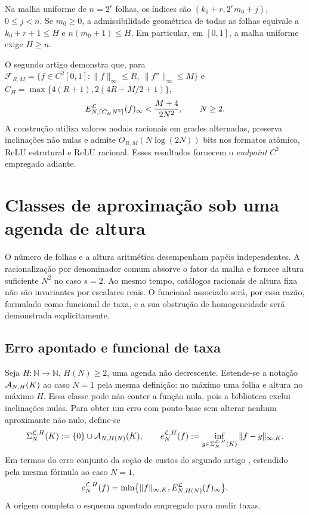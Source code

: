 Na malha uniforme de $n=2^r$ folhas, os índices são $(k_0+r,2^rm_0+j)$, $0\le j<n$. Se $m_0\ge0$, a admissibilidade geométrica de todas as folhas equivale a $k_0+r+1\le H$ e $n(m_0+1)\le H$. Em particular, em $[0,1]$, a malha uniforme exige $H\ge n$.

O segundo artigo demonstra que, para $\mathcal F_{R,M}=\{f\in C^2[0,1]:\|f\|_\infty\le R,\ \|f''\|_\infty\le M\}$ e $C_H=\max\{4(R+1),2(4R+M/2+1)\}$,
\[
 E_{N,\lceil C_HN^2\rceil}^{\mathcal{L}}(f)_\infty<\frac{M+4}{2N^2},\qquad N\ge2.
\]
A construção utiliza valores nodais racionais em grades alternadas, preserva inclinações não nulas e admite $O_{R,M}(N\log(2N))$ bits nos formatos atômico, ReLU estrutural e ReLU racional. Esses resultados fornecem o \emph{endpoint} $C^2$ empregado adiante.

\section{Classes de aproximação sob uma agenda de altura}
\label{artigo_3:sec:approximation-classes}

O número de folhas e a altura aritmética desempenham papéis independentes. A
racionalização por denominador comum absorve o fator da malha e fornece
altura suficiente $N^2$ no caso $s=2$. Ao mesmo tempo, catálogos racionais de
altura fixa não são invariantes por escalares reais. O funcional
associado será, por essa razão, formulado como funcional de taxa, e a sua obstrução de
homogeneidade será demonstrada explicitamente.

\subsection{Erro apontado e funcional de taxa}

Seja $H:\mathbb N\to\mathbb N$, $H(N)\ge2$, uma agenda não decrescente.
Estende-se a notação $\mathcal{A}_{N,H}(K)$ ao caso $N=1$ pela mesma
definição: no máximo uma folha e altura no máximo $H$. Essa classe pode não
conter a função nula, pois a
biblioteca exclui inclinações nulas. Para obter um erro com ponto-base sem
alterar nenhum aproximante não nulo, define-se
\begin{equation}
 \Sigma_N^{\mathcal{L},H}(K)
 :=\{0\}\cup\mathcal{A}_{N,H(N)}(K),
 \qquad
 e_N^{\mathcal{L},H}(f)
 :=\inf_{g\in\Sigma_N^{\mathcal{L},H}(K)}\|f-g\|_{\infty,K}.
 \label{artigo_3:eq:pointed-error}
\end{equation}
Em termos do erro conjunto da seção de custos do segundo artigo \citep{artigo_2-oliveiraII}, estendido pela mesma fórmula
ao caso $N=1$,
\begin{equation}
 e_N^{\mathcal{L},H}(f)
 =\min\bigl\{\|f\|_{\infty,K},
 E_{N,H(N)}^{\mathcal{L}}(f)_\infty\bigr\}.
 \label{artigo_3:eq:pointed-inherited}
\end{equation}
A origem completa o esquema apontado empregado para medir taxas.

